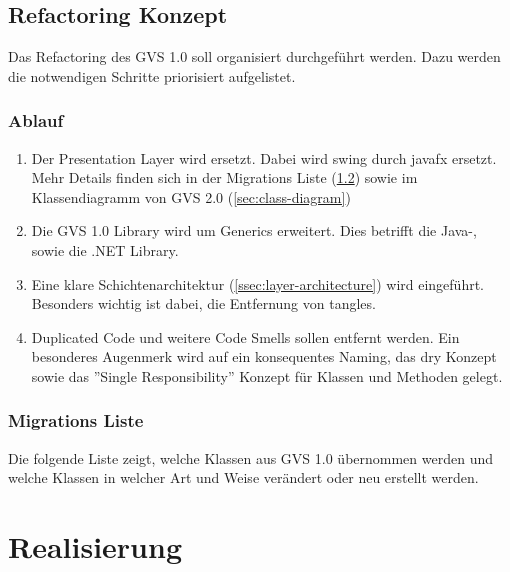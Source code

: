 \documentclass[11pt,a4paper,english,oneside]{book}
\numberwithin{equation}{chapter}
\begin{document}
	\section{Refactoring Konzept} \label{sec:refactroing-concept}
	Das Refactoring des GVS 1.0 soll organisiert durchgeführt werden. Dazu werden die notwendigen Schritte priorisiert aufgelistet.
		
	\subsection{Ablauf}\label{ssec:ablauf}
	\begin{enumerate}
		\item Der Presentation Layer wird ersetzt. Dabei wird \gls{swing} durch \gls{javafx} ersetzt. Mehr Details finden sich in der Migrations Liste (\ref{ssec:class-refactroing-list}) sowie im Klassendiagramm von GVS 2.0 (\ref{sec:class-diagram})
		\item Die GVS 1.0 Library wird um Generics erweitert. Dies betrifft die Java-, sowie die .NET Library.
		\item Eine klare Schichtenarchitektur (\ref{ssec:layer-architecture}) wird eingeführt. Besonders wichtig ist dabei, die Entfernung von \gls{tangle}s.
		\item Duplicated Code und weitere Code Smells sollen entfernt werden. Ein besonderes Augenmerk wird auf ein konsequentes Naming, das \gls{dry} Konzept sowie das ''Single Responsibility'' Konzept für Klassen und Methoden gelegt.
	\end{enumerate}

	\subsection{Migrations Liste}
		\label{ssec:class-refactroing-list}
		Die folgende Liste zeigt, welche Klassen aus GVS 1.0 übernommen werden und welche Klassen in welcher Art und Weise verändert oder neu erstellt werden.
	
		
	
	\chapter{Realisierung}
		
\end{document}
